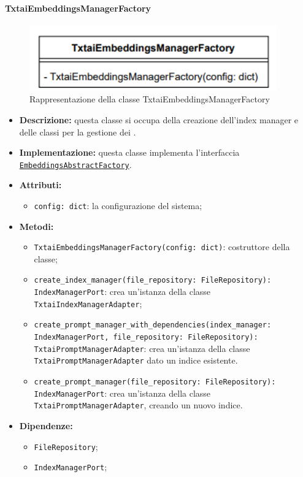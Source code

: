 \paragraph{TxtaiEmbeddingsManagerFactory} \label{TxtaiEmbeddingsManagerFactory}
\begin{figure}[H]
    \centering
    \includegraphics[width=0.95\textwidth]{assets/Backend/txtai_embeddings_manager_factory.png}
    \caption{Rappresentazione della classe TxtaiEmbeddingsManagerFactory}
  \end{figure}
\begin{itemize}
    \item \textbf{Descrizione:} questa classe si occupa della creazione dell'index manager e delle classi per la gestione dei .
    \item \textbf{Implementazione:} questa classe implementa l'interfaccia \hyperref[EmbeddingsAbstractFactory]{\texttt{EmbeddingsAbstractFactory}}. 
    \item \textbf{Attributi:}
    \begin{itemize}
        \item \texttt{config: dict}: la configurazione del sistema;
    \end{itemize}
    \item \textbf{Metodi:}
    \begin{itemize}
        \item \texttt{TxtaiEmbeddingsManagerFactory(config: dict)}: costruttore della classe;
        \item \texttt{create\_index\_manager(file\_repository: FileRepository): IndexManagerPort}: crea un'istanza della classe \texttt{TxtaiIndexManagerAdapter};
        \item \texttt{create\_prompt\_manager\_with\_dependencies(index\_manager: IndexManagerPort, file\_repository: FileRepository): TxtaiPromptManagerAdapter}: crea un'istanza della classe \texttt{TxtaiPromptManagerAdapter} dato un indice esistente.
        \item \texttt{create\_prompt\_manager(file\_repository: FileRepository): IndexManagerPort}: crea un'istanza della classe \texttt{TxtaiPromptManagerAdapter}, creando un nuovo indice.
    \end{itemize}
    \item \textbf{Dipendenze:}
    \begin{itemize}
        \item \texttt{FileRepository};
        \item \texttt{IndexManagerPort};
    \end{itemize}
\end{itemize} 

